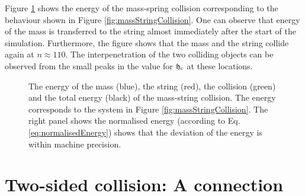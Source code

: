 Figure \ref{fig:massStringCollisionEnergy} shows the energy of the mass-spring collision corresponding to the behaviour shown in Figure \ref{fig:massStringCollision}. One can observe that energy of the mass is transferred to the string almost immediately after the start of the simulation. Furthermore, the figure shows that the mass and the string collide again at $n\approx 110$. The interpenetration of the two colliding objects can be observed from the small peaks in the value for $\mathfrak{h}_{\text{c}}$ at these locations. 

\begin{figure}[h]
    \centering
      \caption{The energy of the mass (blue), the string (red), the collision (green) and the total energy (black) of the mass-string collision. The energy corresponds to the system in Figure \ref{fig:massStringCollision}. The right panel shows the normalised energy (according to Eq. \eqref{eq:normalisedEnergy}) shows that the deviation of the energy is within machine precision. \label{fig:massStringCollisionEnergy}}
\end{figure}
\section{Two-sided collision: A connection}\label{sec:twoSidedCollision}

